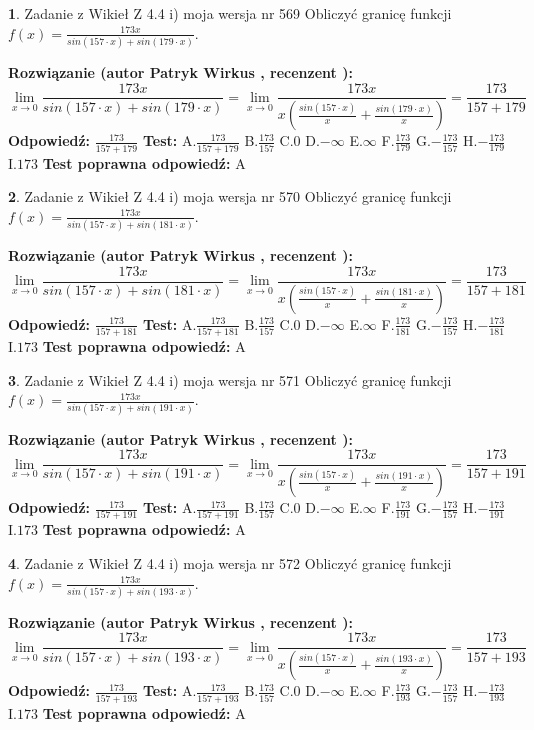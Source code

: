 \documentclass[12pt, a4paper]{article}
\theoremstyle{definition} %
\newtheorem{zad}{}
\newcommand{\zadStart}[1]{\begin{zad}#1\newline}
\newcommand{\zadStop}{\end{zad}}
\newcommand{\rozwStart}[2]{\noindent \textbf{Rozwiązanie (autor #1 , recenzent #2): }\newline}
\newcommand{\rozwStop}{\newline}
\newcommand{\odpStart}{\noindent \textbf{Odpowiedź:}\newline}
\newcommand{\odpStop}{\newline}
\newcommand{\testStart}{\noindent \textbf{Test:}\newline}
\newcommand{\testStop}{\newline}
\newcommand{\kluczStart}{\noindent \textbf{Test poprawna odpowiedź:}\newline}
\newcommand{\kluczStop}{\newline}
\begin{document}
\zadStart{Zadanie z Wikieł Z 4.4 i) moja wersja nr 569}
Obliczyć granicę funkcji $f(x)=\frac{173x}{sin(157\cdot x) +sin(179\cdot x)}$.
\zadStop
\rozwStart{Patryk Wirkus}{}
$$\lim\limits_{x\to 0}\frac{173x}{sin(157\cdot x) +sin(179\cdot x)}=\lim\limits_{x\to 0}\frac{173x}{x(\frac{sin(157\cdot x)}{x}+\frac{sin(179\cdot x)}{x})}=\frac{173}{157+179}$$
\rozwStop
\odpStart
$\frac{173}{157+179}$
\odpStop
\testStart
A.$\frac{173}{157+179}$
B.$\frac{173}{157}$
C.$0$
D.$-\infty$
E.$\infty$
F.$\frac{173}{179}$
G.$-\frac{173}{157}$
H.$-\frac{173}{179}$
I.$173$
\testStop
\kluczStart
A
\kluczStop



\zadStart{Zadanie z Wikieł Z 4.4 i) moja wersja nr 570}
Obliczyć granicę funkcji $f(x)=\frac{173x}{sin(157\cdot x) +sin(181\cdot x)}$.
\zadStop
\rozwStart{Patryk Wirkus}{}
$$\lim\limits_{x\to 0}\frac{173x}{sin(157\cdot x) +sin(181\cdot x)}=\lim\limits_{x\to 0}\frac{173x}{x(\frac{sin(157\cdot x)}{x}+\frac{sin(181\cdot x)}{x})}=\frac{173}{157+181}$$
\rozwStop
\odpStart
$\frac{173}{157+181}$
\odpStop
\testStart
A.$\frac{173}{157+181}$
B.$\frac{173}{157}$
C.$0$
D.$-\infty$
E.$\infty$
F.$\frac{173}{181}$
G.$-\frac{173}{157}$
H.$-\frac{173}{181}$
I.$173$
\testStop
\kluczStart
A
\kluczStop



\zadStart{Zadanie z Wikieł Z 4.4 i) moja wersja nr 571}
Obliczyć granicę funkcji $f(x)=\frac{173x}{sin(157\cdot x) +sin(191\cdot x)}$.
\zadStop
\rozwStart{Patryk Wirkus}{}
$$\lim\limits_{x\to 0}\frac{173x}{sin(157\cdot x) +sin(191\cdot x)}=\lim\limits_{x\to 0}\frac{173x}{x(\frac{sin(157\cdot x)}{x}+\frac{sin(191\cdot x)}{x})}=\frac{173}{157+191}$$
\rozwStop
\odpStart
$\frac{173}{157+191}$
\odpStop
\testStart
A.$\frac{173}{157+191}$
B.$\frac{173}{157}$
C.$0$
D.$-\infty$
E.$\infty$
F.$\frac{173}{191}$
G.$-\frac{173}{157}$
H.$-\frac{173}{191}$
I.$173$
\testStop
\kluczStart
A
\kluczStop



\zadStart{Zadanie z Wikieł Z 4.4 i) moja wersja nr 572}
Obliczyć granicę funkcji $f(x)=\frac{173x}{sin(157\cdot x) +sin(193\cdot x)}$.
\zadStop
\rozwStart{Patryk Wirkus}{}
$$\lim\limits_{x\to 0}\frac{173x}{sin(157\cdot x) +sin(193\cdot x)}=\lim\limits_{x\to 0}\frac{173x}{x(\frac{sin(157\cdot x)}{x}+\frac{sin(193\cdot x)}{x})}=\frac{173}{157+193}$$
\rozwStop
\odpStart
$\frac{173}{157+193}$
\odpStop
\testStart
A.$\frac{173}{157+193}$
B.$\frac{173}{157}$
C.$0$
D.$-\infty$
E.$\infty$
F.$\frac{173}{193}$
G.$-\frac{173}{157}$
H.$-\frac{173}{193}$
I.$173$
\testStop
\kluczStart
A
\kluczStop
\end{document}
